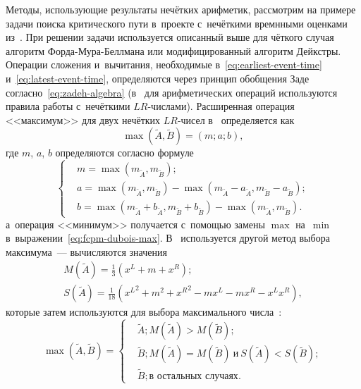 Методы, использующие результаты нечётких арифметик, рассмотрим на примере задачи поиска критического пути в~проекте с~нечёткими времнными оценками из~\cite{Dubois_Prade}. При решении задачи используется описанный выше для чёткого случая алгоритм Форда-Мура-Беллмана или модифицированный алгоритм Дейкстры. Операции сложения и~вычитания, необходимые в~\eqref{eq:earliest-event-time} и~\eqref{eq:latest-event-time}, определяются через принцип обобщения Заде согласно~\eqref{eq:zadeh-algebra} (в~\cite{Iran_Railways, Uskov_FCPM, Leondes} для арифметических операций используются правила работы с~нечёткими $LR$-числами). Расширенная операция <<максимум>> для двух нечётких $LR$-чисел в~\cite{Dubois_Prade, Uskov_FCPM, Pavlov_Sokolov} определяется как
\begin{equation*}
  \max \left(\tilde A, \tilde B \right) = \left(m; a; b \right),
\end{equation*}
где $m$, $a$, $b$ определяются согласно формуле
\begin{equation}
  \label{eq:fcpm-dubois-max}
  \left \{ \begin{aligned}
    & m = \max \left( m_{\tilde A}, m_{\tilde B} \right); \\
    & a = \max \left( m_{\tilde A}, m_{\tilde B} \right) - \max \left( m_{\tilde A} - a_{\tilde A}, m_{\tilde B} - a_{\tilde B} \right); \\
    & b = \max \left( m_{\tilde A} + b_{\tilde A}, m_{\tilde B} + b_{\tilde B} \right) - \max \left( m_{\tilde A}, m_{\tilde B} \right).
  \end{aligned} \right.
\end{equation}
а~операция <<минимум>> получается с~помощью замены $\max$ на~$\min$ в~выражении~\eqref{eq:fcpm-dubois-max}. В~\cite{Leondes} используется другой метод выбора максимума~--- вычисляются значения
\begin{gather*}
  M\left(\tilde A \right) = \frac{1}{3}\left(x^L+m+x^R\right); \\
  S\left(\tilde A \right) = \frac{1}{18}\left( {x^L}^2+m^2+{x^R}^2 - mx^L - mx^R -x^L x^R \right),
\end{gather*}
которые затем используются для выбора максимального числа~\cite{McCahon_Lee}:
\begin{equation}
\label{eq:mccaloh-lee-comparison}
  \max \left(\tilde A, \tilde B \right) =
  \left\{ \begin{aligned}
    & \tilde A; M\left(\tilde A \right) > M\left(\tilde B \right); \\
    & \tilde B; M\left(\tilde A \right) = M\left(\tilde B \right)\ \text{и}\ S\left(\tilde A \right) < S\left(\tilde B \right); \\
    & \tilde B; \text{в остальных случаях}.
  \end{aligned}\right.
\end{equation}

